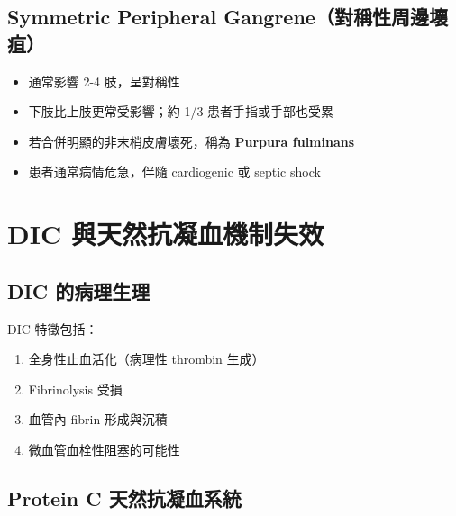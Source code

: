 \documentclass[12pt,a4paper]{article}
\begin{document}
\subsection{Symmetric Peripheral Gangrene（對稱性周邊壞疽）}

\begin{itemize}
    \item 通常影響 2-4 肢，呈對稱性
    \item 下肢比上肢更常受影響；約 1/3 患者手指或手部也受累
    \item 若合併明顯的非末梢皮膚壞死，稱為 \textbf{Purpura fulminans}
    \item 患者通常病情危急，伴隨 cardiogenic 或 septic shock
\end{itemize}

\section{DIC 與天然抗凝血機制失效}

\subsection{DIC 的病理生理}

DIC 特徵包括：
\begin{enumerate}
    \item 全身性止血活化（病理性 thrombin 生成）
    \item Fibrinolysis 受損
    \item 血管內 fibrin 形成與沉積
    \item 微血管血栓性阻塞的可能性
\end{enumerate}


\subsection{Protein C 天然抗凝血系統}
\end{document}
